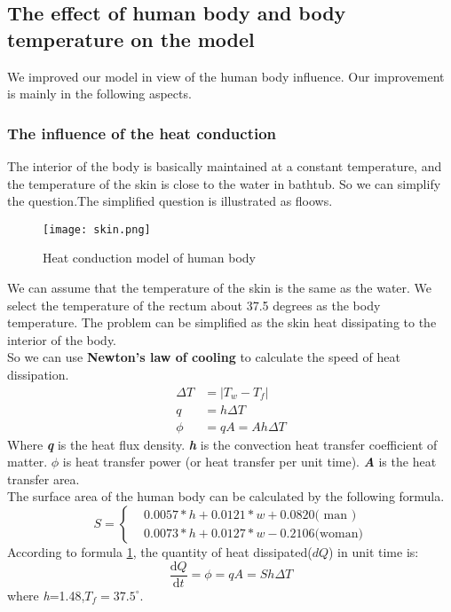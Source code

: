 \documentclass{mcmthesis}
\begin{document}
\subsection{The effect of human body and body temperature on the model}
We improved our model in view of the human body influence. Our improvement is mainly in the following aspects.
\subsubsection{The influence of the heat conduction}%
The interior of the body is basically maintained at a constant temperature, and the temperature of the skin is close to the water in bathtub. So we can simplify the question.The simplified question is illustrated as floows.\\

\begin{figure}[H]
\centerline{\texttt{[image: skin.png]}}
\caption{Heat conduction model of human body}
\label{skin}
\end{figure}
\indent We can assume that the temperature of the skin is the same as the water. We select the temperature of the rectum about 37.5 degrees as the body temperature. The problem can be simplified as the skin heat dissipating to the interior of the body.\\
\indent So we can use {\bf Newton's law of cooling} to calculate the speed of heat dissipation.\\
\begin{equation}
\begin{split}
\Delta T&=|T_{w}-T_{f}| \\
q&=h\Delta T	\\
\phi &=qA=Ah\Delta T
\end{split}
\end{equation}
\indent Where \textbf{\emph{q}} is the heat flux density. \textbf{\emph{h}} is the convection heat transfer coefficient of matter. \textbf{\emph{$\phi$}}  is heat transfer power (or heat transfer per unit time). \textbf{\emph{A}} is the heat transfer area.\\
\indent The surface area of the human body can be calculated by the following formula.
\begin{equation}
S= \begin{cases} & 0.0057*h+0.0121*w+0.0820\text{( man )} \\ & 0.0073*h+0.0127*w-0.2106\text{(woman)} \end{cases}
\label{s}
\end{equation}
\indent According to formula \ref{skin}, the quantity of heat dissipated($dQ$) in unit time is:
\begin{equation}
	\frac{\mathrm{d} Q}{\mathrm{d} t}=\phi =qA=Sh\Delta T
	\label{Q_skin}
\end{equation}
where \emph{h}=1.48,${T_{f}}=37.5^{\circ}$. \\
\end{document}
